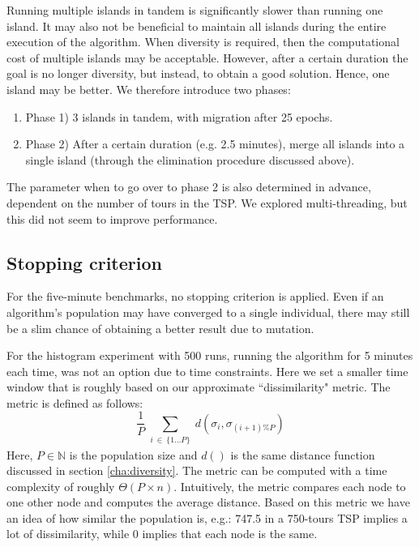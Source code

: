 \documentclass[a4paper,10pt]{article}
\begin{document}
\begin{enumerate}
		Running multiple islands in tandem is significantly slower than running one island. It may also not be beneficial to maintain all islands during the entire execution of the algorithm. When diversity is required, then the computational cost of multiple islands may be acceptable. However, after a certain duration the goal is no longer diversity, but instead, to obtain a good solution. Hence, one island may be better. We therefore introduce two phases:
		\begin{enumerate}
			\item Phase 1) 3 islands in tandem, with migration after 25 epochs.
			\item Phase 2) After a certain duration (e.g. 2.5 minutes), merge all islands into a single island (through the elimination procedure discussed above).
		\end{enumerate}
		
		The parameter when to go over to phase 2 is also determined in advance, dependent on the number of tours in the TSP.  We explored multi-threading, but this did not seem to improve performance.
		 	
	
	\end{enumerate}
		


\subsection{Stopping criterion}
For the five-minute benchmarks, no stopping criterion is applied. Even if an algorithm's population may have converged to a single individual, there may still be a slim chance of obtaining a better result due to mutation. 

For the histogram experiment with 500 runs, running the algorithm for 5 minutes each time, was not an option due to time constraints. Here we set a smaller time window that is roughly based on our approximate ``dissimilarity" metric. The metric is defined as follows:
$$
\frac{1}{P} \sum_{\substack{i~\in~\{1 \dots P \}}} d(\sigma_i, \sigma_{(i+1) \% P})
$$
Here, $P \in \mathbb{N}$ is the population size and $d()$ is the same distance function discussed in section \ref{cha:diversity}. The metric can be computed with a time complexity of roughly $\Theta(P \times n)$.
Intuitively, the metric compares each node to one other node and computes the average distance. Based on this metric we have an idea of how similar the population is, e.g.: 747.5 in a 750-tours TSP implies a lot of dissimilarity, while 0 implies that each node is the same.
\end{document}
